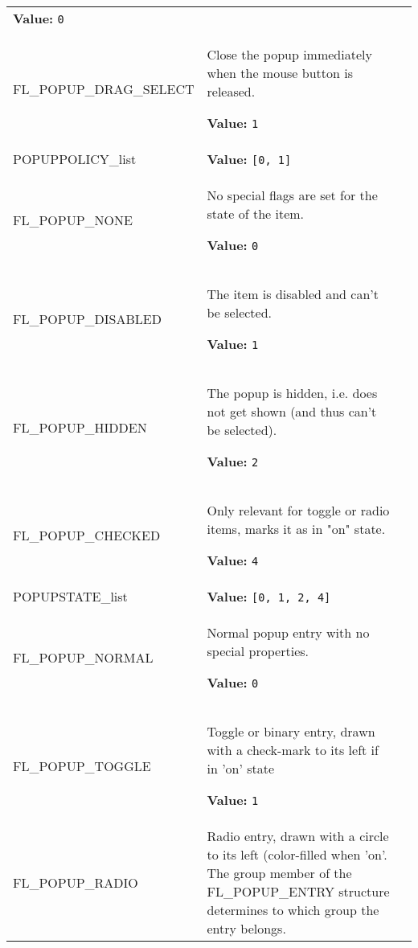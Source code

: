 \begin{longtable}{|p{\varnamewidth}|p{\vardescrwidth}|l}
\textbf{Value:} 
{\tt 0}&\\
\cline{1-2}
\raggedright F\-L\-\_\-P\-O\-P\-U\-P\-\_\-D\-R\-A\-G\-\_\-S\-E\-L\-E\-C\-T\- & \raggedright Close the popup immediately when the mouse button is released.

\textbf{Value:} 
{\tt 1}&\\
\cline{1-2}
\raggedright P\-O\-P\-U\-P\-P\-O\-L\-I\-C\-Y\-\_\-l\-i\-s\-t\- & \raggedright \textbf{Value:} 
{\tt \texttt{[}0\texttt{, }1\texttt{]}}&\\
\cline{1-2}
\raggedright F\-L\-\_\-P\-O\-P\-U\-P\-\_\-N\-O\-N\-E\- & \raggedright No special flags are set for the state of the item.

\textbf{Value:} 
{\tt 0}&\\
\cline{1-2}
\raggedright F\-L\-\_\-P\-O\-P\-U\-P\-\_\-D\-I\-S\-A\-B\-L\-E\-D\- & \raggedright The item is disabled and can't be selected.

\textbf{Value:} 
{\tt 1}&\\
\cline{1-2}
\raggedright F\-L\-\_\-P\-O\-P\-U\-P\-\_\-H\-I\-D\-D\-E\-N\- & \raggedright The popup is hidden, i.e. does not get shown (and thus can't be 
          selected).

\textbf{Value:} 
{\tt 2}&\\
\cline{1-2}
\raggedright F\-L\-\_\-P\-O\-P\-U\-P\-\_\-C\-H\-E\-C\-K\-E\-D\- & \raggedright Only relevant for toggle or radio items, marks it as in "on" 
          state.

\textbf{Value:} 
{\tt 4}&\\
\cline{1-2}
\raggedright P\-O\-P\-U\-P\-S\-T\-A\-T\-E\-\_\-l\-i\-s\-t\- & \raggedright \textbf{Value:} 
{\tt \texttt{[}0\texttt{, }1\texttt{, }2\texttt{, }4\texttt{]}}&\\
\cline{1-2}
\raggedright F\-L\-\_\-P\-O\-P\-U\-P\-\_\-N\-O\-R\-M\-A\-L\- & \raggedright Normal popup entry with no special properties.

\textbf{Value:} 
{\tt 0}&\\
\cline{1-2}
\raggedright F\-L\-\_\-P\-O\-P\-U\-P\-\_\-T\-O\-G\-G\-L\-E\- & \raggedright Toggle or binary entry, drawn with a check-mark to its left if in
          'on' state

\textbf{Value:} 
{\tt 1}&\\
\cline{1-2}
\raggedright F\-L\-\_\-P\-O\-P\-U\-P\-\_\-R\-A\-D\-I\-O\- & \raggedright Radio entry, drawn with a circle to its left (color-filled when 
          'on'. The group member of the FL\_POPUP\_ENTRY structure 
          determines to which group the entry belongs.


\end{longtable}
